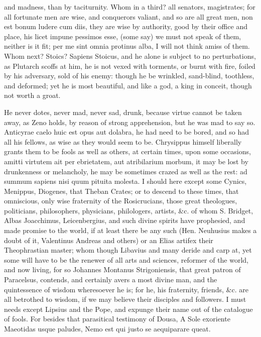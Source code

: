 {and madness, than by taciturnity. Whom in a third? all senators,
magistrates; for all fortunate men are wise, and conquerors valiant,
and so are all great men, non est bonum ludere cum diis, they are wise
by authority, good by their office and place, his licet impune pessimos
esse, (some say) we must not speak of them, neither is it fit; per me
sint omnia protinus alba, I will not think amiss of them. Whom next?
Stoics? Sapiens Stoicus, and he alone is subject to no perturbations,
as Plutarch scoffs at him, he is not vexed with torments, or burnt
with fire, foiled by his adversary, sold of his enemy: though he be
wrinkled, sand-blind, toothless, and deformed; yet he is most
beautiful, and like a god, a king in conceit, though not worth a groat.

He never dotes, never mad, never sad, drunk, because virtue cannot be
taken away, as Zeno holds, by reason of strong apprehension, but
he was mad to say so. Anticyrae caelo huic est opus aut dolabra,
he had need to be bored, and so had all his fellows, as wise as they
would seem to be. Chrysippus himself liberally grants them to be fools
as well as others, at certain times, upon some occasions, amitti
virtutem ait per ebrietatem, aut atribilarium morbum, it may be lost by
drunkenness or melancholy, he may be sometimes crazed as well as the
rest: ad summum sapiens nisi quum pituita molesta. I should here
except some Cynics, Menippus, Diogenes, that Theban Crates; or to
descend to these times, that omniscious, only wise fraternity of
the Rosicrucians, those great theologues, politicians, philosophers,
physicians, philologers, artists, \&c. of whom S. Bridget, Albas
Joacchimus, Leicenbergius, and such divine spirits have prophesied, and
made promise to the world, if at least there be any such (Hen.
Neuhusius makes a doubt of it,  Valentinus Andreas and
others) or an Elias artifex their Theophrastian master; whom though
Libavius and many deride and carp at, yet some will have to be the
renewer of all arts and sciences, reformer of the world, and now
living, for so Johannes Montanus Strigoniensis, that great patron of
Paracelsus, contends, and certainly avers a most divine man, and
the quintessence of wisdom wheresoever he is; for he, his fraternity,
friends, \&c. are all betrothed to wisdom, if we may believe their
disciples and followers. I must needs except Lipsius and the Pope, and
expunge their name out of the catalogue of fools. For besides that
parasitical testimony of Dousa,
A Sole exoriente Maeotidas usque paludes,
Nemo est qui justo se aequiparare queat.

}
